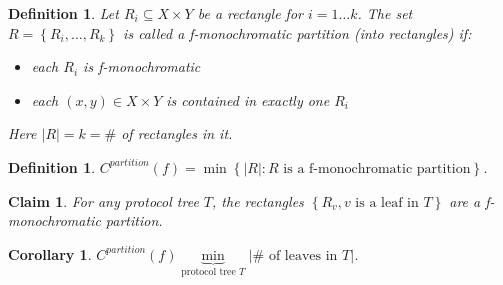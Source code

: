\documentclass[twoside]{article}
\newtheorem{claim}[theorem]{Claim}
\newtheorem{corollary}[theorem]{Corollary}
\newtheorem{definition}[theorem]{Definition}
\newcommand{\set}[1]{\left \{ #1 \right \}}
\newcommand{\abs}[1]{\left | #1 \right |}
\begin{document}
\begin{definition}
    Let $R_i \subseteq X \times Y$ be a rectangle for $i = 1 \ldots k$. The set $R = \set{R_i, \ldots, R_k}$ is called a f-monochromatic partition (into rectangles) if:

    \begin{itemize}
        \item each $R_i$ is f-monochromatic
        \item each $(x, y) \in X \times Y$ is contained in exactly one $R_i$
    \end{itemize}

    Here $\abs{R} = k = \#$ of rectangles in it.
\end{definition}

\begin{definition}
    $C^{partition}(f) = \min \set{\abs{R}: R \text{ is a f-monochromatic partition}}$.
\end{definition}

\begin{claim}
    For any protocol tree $T$, the rectangles $\set{R_v, v \text{ is a leaf in } T}$ are a f-monochromatic partition.
\end{claim}

\begin{corollary}
    $C^{partition}(f) \underbrace{\min}_{\text{protocol tree } T} \abs{\# \text{ of leaves in } T}$.
\end{corollary}
\end{document}
